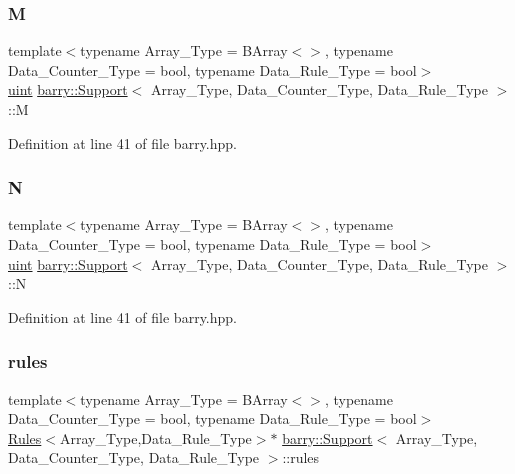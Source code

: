 \subsubsection{\texorpdfstring{M}{M}}
{\footnotesize\ttfamily template$<$typename Array\+\_\+\+Type  = B\+Array$<$$>$, typename Data\+\_\+\+Counter\+\_\+\+Type  = bool, typename Data\+\_\+\+Rule\+\_\+\+Type  = bool$>$ \\
\hyperlink{namespacebarry_a11dfc53ddb4672278319aa04f1e09a6c}{uint} \hyperlink{classbarry_1_1_support}{barry\+::\+Support}$<$ Array\+\_\+\+Type, Data\+\_\+\+Counter\+\_\+\+Type, Data\+\_\+\+Rule\+\_\+\+Type $>$\+::M}



Definition at line 41 of file barry.\+hpp.

\mbox{\label{classbarry_1_1_support_a776221deb92d113e5dee1cb100174ed4}} 
\subsubsection{\texorpdfstring{N}{N}}
{\footnotesize\ttfamily template$<$typename Array\+\_\+\+Type  = B\+Array$<$$>$, typename Data\+\_\+\+Counter\+\_\+\+Type  = bool, typename Data\+\_\+\+Rule\+\_\+\+Type  = bool$>$ \\
\hyperlink{namespacebarry_a11dfc53ddb4672278319aa04f1e09a6c}{uint} \hyperlink{classbarry_1_1_support}{barry\+::\+Support}$<$ Array\+\_\+\+Type, Data\+\_\+\+Counter\+\_\+\+Type, Data\+\_\+\+Rule\+\_\+\+Type $>$\+::N}



Definition at line 41 of file barry.\+hpp.

\mbox{\label{classbarry_1_1_support_a9311c3288f59feaece0680f9a7b630dd}} 
\subsubsection{\texorpdfstring{rules}{rules}}
{\footnotesize\ttfamily template$<$typename Array\+\_\+\+Type  = B\+Array$<$$>$, typename Data\+\_\+\+Counter\+\_\+\+Type  = bool, typename Data\+\_\+\+Rule\+\_\+\+Type  = bool$>$ \\
\hyperlink{classbarry_1_1_rules}{Rules}$<$Array\+\_\+\+Type,Data\+\_\+\+Rule\+\_\+\+Type$>$$\ast$ \hyperlink{classbarry_1_1_support}{barry\+::\+Support}$<$ Array\+\_\+\+Type, Data\+\_\+\+Counter\+\_\+\+Type, Data\+\_\+\+Rule\+\_\+\+Type $>$\+::rules}



